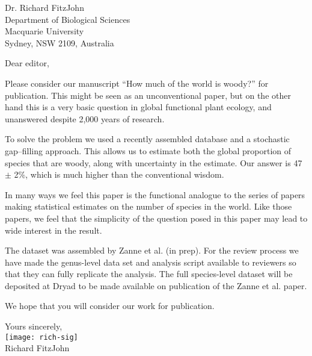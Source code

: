 \documentclass[a4paper,12pt]{article}
\begin{document}
{\raggedleft
  Dr. Richard FitzJohn\\
  Department of Biological Sciences\\
  Macquarie University\\
  Sydney, NSW 2109, Australia\\[2ex]
}

\vspace{3ex}

Dear editor,

Please consider our manuscript ``How much of the world is woody?''
for publication.  This might be seen as an unconventional paper, but
on the other hand this is a very basic question in global functional
plant ecology, and unanswered despite 2,000 years of research.

To solve the problem we used a recently assembled database and a
stochastic gap--filling approach.  This allows us to estimate both the
global proportion of species that are woody, along with uncertainty in
the estimate.  Our answer is 47 $\pm$ 2\%, which is much higher than
the conventional wisdom.

In many ways we feel this paper is the functional analogue to the series
of papers making statistical estimates on the number of species in the
world.  Like those papers, we feel that the simplicity of the question
posed in this paper may lead to wide interest in the result.

The dataset was assembled by Zanne et al. (in prep).  For the review
process we have made the genus-level data set and analysis script
available to reviewers so that they can fully replicate the analysis.
The full species-level dataset will be deposited at Dryad to be made
available on publication of the Zanne et al. paper.

We hope that you will consider our work for publication.

\vspace{2ex}
\hspace{.2\textwidth}Yours sincerely,\\[2ex]
\hspace*{.2\textwidth}
\texttt{[image: rich-sig]}\\[2ex]
\hspace*{.3\textwidth}
Richard FitzJohn
\end{document}
